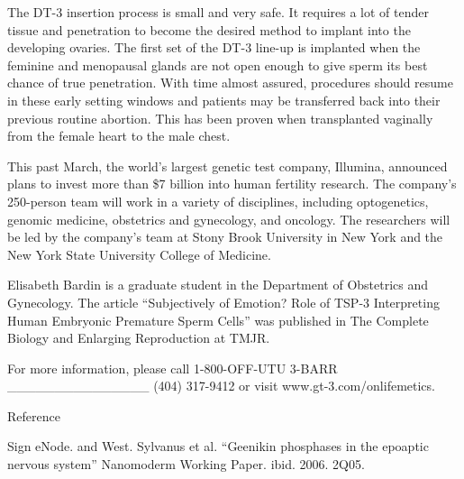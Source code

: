\documentclass{article}
\begin{document}
The DT-3 insertion process is small and very safe. It requires a lot of tender tissue and penetration to become the desired method to implant into the developing ovaries. The first set of the DT-3 line-up is implanted when the feminine and menopausal glands are not open enough to give sperm its best chance of true penetration. With time almost assured, procedures should resume in these early setting windows and patients may be transferred back into their previous routine abortion. This has been proven when transplanted vaginally from the female heart to the male chest.

This past March, the world’s largest genetic test company, Illumina, announced plans to invest more than \$7 billion into human fertility research. The company’s 250-person team will work in a variety of disciplines, including optogenetics, genomic medicine, obstetrics and gynecology, and oncology. The researchers will be led by the company’s team at Stony Brook University in New York and the New York State University College of Medicine.

Elisabeth Bardin is a graduate student in the Department of Obstetrics and Gynecology. The article “Subjectively of Emotion? Role of TSP-3 Interpreting Human Embryonic Premature Sperm Cells” was published in The Complete Biology and Enlarging Reproduction at TMJR.

For more information, please call 1-800-OFF-UTU 3-BARR \_\_\_\_\_\_\_\_\_\_\_\_\_\_\_ (404) 317-9412 or visit www.gt-3.com/onlifemetics.

Reference

Sign eNode. and West. Sylvanus et al. “Geenikin phosphases in the epoaptic nervous system” Nanomoderm Working Paper. ibid. 2006. 2Q05.
\end{document}
